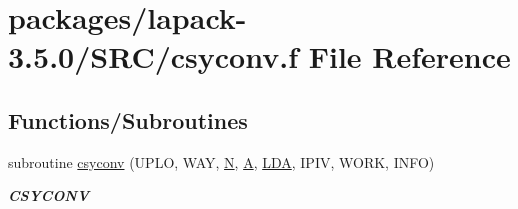 \hypertarget{csyconv_8f}{}\section{packages/lapack-\/3.5.0/\+S\+R\+C/csyconv.f File Reference}
\label{csyconv_8f}
\subsection*{Functions/\+Subroutines}
\begin{DoxyCompactItemize}
\item 
subroutine \hyperlink{group__complexSYcomputational_ga719b4e07d6c857e1cfbeebf9ac8d115b}{csyconv} (U\+P\+L\+O, W\+A\+Y, \hyperlink{polmisc_8c_a0240ac851181b84ac374872dc5434ee4}{N}, \hyperlink{classA}{A}, \hyperlink{example__user_8c_ae946da542ce0db94dced19b2ecefd1aa}{L\+D\+A}, I\+P\+I\+V, W\+O\+R\+K, I\+N\+F\+O)
\begin{DoxyCompactList}\small\item\em {\bfseries C\+S\+Y\+C\+O\+N\+V} \end{DoxyCompactList}\end{DoxyCompactItemize}
